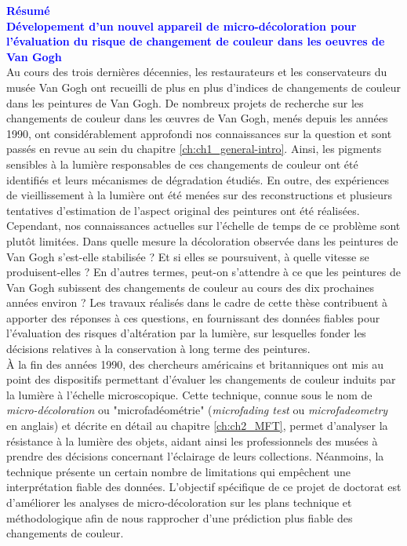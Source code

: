 \newpage
\textbf{\textcolor{blue}{\LARGE Résumé}}\\

\textbf{\textcolor{blue}{Dévelopement d'un nouvel appareil de micro-décoloration pour l'évaluation du risque de changement de couleur dans les oeuvres de Van Gogh}}\\

Au cours des trois dernières décennies, les restaurateurs et les conservateurs du musée Van Gogh ont recueilli de plus en plus d'indices de changements de couleur dans les peintures de Van Gogh. De nombreux projets de recherche sur les changements de couleur dans les œuvres de Van Gogh, menés depuis les années 1990, ont considérablement approfondi nos connaissances sur la question et sont passés en revue au sein du chapitre \ref{ch:ch1_general-intro}. Ainsi, les pigments sensibles à la lumière responsables de ces changements de couleur ont été identifiés et leurs mécanismes de dégradation étudiés. En outre, des expériences de vieillissement à la lumière ont été menées sur des reconstructions et plusieurs tentatives d'estimation de l'aspect original des peintures ont été réalisées. Cependant, nos connaissances actuelles sur l'échelle de temps de ce problème sont plutôt limitées. Dans quelle mesure la décoloration observée dans les peintures de Van Gogh s'est-elle stabilisée ? Et si elles se poursuivent, à quelle vitesse se produisent-elles ? En d'autres termes, peut-on s'attendre à ce que les peintures de Van Gogh subissent des changements de couleur au cours des dix prochaines années environ ? Les travaux réalisés dans le cadre de cette thèse contribuent à apporter des réponses à ces questions, en fournissant des données fiables pour l'évaluation des risques d'altération par la lumière, sur lesquelles fonder les décisions relatives à la conservation à long terme des peintures. \\

À la fin des années 1990, des chercheurs américains et britanniques ont mis au point des dispositifs permettant d'évaluer les changements de couleur induits par la lumière à l'échelle microscopique. Cette technique, connue sous le nom de \textit{micro-décoloration} ou "microfadéométrie" (\textit{microfading test} ou \textit{microfadeometry} en anglais) et décrite en détail au chapitre \ref{ch:ch2_MFT}, permet d'analyser la résistance à la lumière des objets, aidant ainsi les professionnels des musées à prendre des décisions concernant l'éclairage de leurs collections. Néanmoins, la technique présente un certain nombre de limitations qui empêchent une interprétation fiable des données. L'objectif spécifique de ce projet de doctorat est d'améliorer les analyses de micro-décoloration sur les plans technique et méthodologique afin de nous rapprocher d'une prédiction plus fiable des changements de couleur. \\

